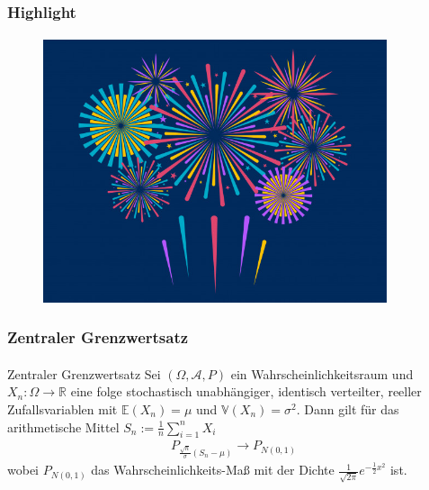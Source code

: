 \documentclass{beamer}
\begin{document}
\begin{frame}
    \frametitle{Highlight}
\framesubtitle{}
\begin{figure}[htp]
      \centering
    \includegraphics[width=0.9\textwidth]{img/firework}
\end{figure}
 \end{frame}


\begin{frame}
    \frametitle{Zentraler Grenzwertsatz}
\framesubtitle{}


\begin{block}{Zentraler Grenzwertsatz}
Sei $(\Omega, \mathcal{A}, P)$ ein Wahrscheinlichkeitsraum und $X_n :  \Omega \to \mathbb{R}$  eine folge stochastisch unabhängiger, identisch verteilter, reeller Zufallsvariablen mit $\mathbb{E}(X_n) = \mu$ und $\mathbb{V}(X_n)= \sigma^2$. Dann gilt für das arithmetische Mittel $S_n:= \frac{1}{n} \sum_{i=1}^n X_i$
\begin{align*}
P_{ \frac{\sqrt{n}}{\sigma} (S_n-\mu)} \to P_{N(0,1)}
\end{align*}
wobei $ P_{N(0,1)}$ das Wahrscheinlichkeits-Maß mit der Dichte $ \frac {1}{ \sqrt{2\pi}}e^{- \frac {1}{2} x^2}$ ist.
\end{block}

 \end{frame}
\end{document}
